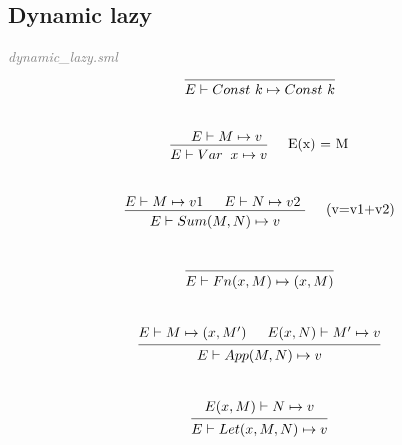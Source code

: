 \documentclass[a4paper]{article}
\begin{document}
	\subsection{Dynamic lazy}
	\textit{\textcolor{gray}{dynamic\_lazy.sml}} \\
	\[
		\begin{prooftree}
			\hypo{}
			\infer1[]{E \vdash Const \ k\mapsto Const \ k}
		\end{prooftree}
	\]
	\\
	\[
		\begin{prooftree}
			\hypo{E \vdash M \mapsto v }
			\infer1[\quad E(x) = M]{E \vdash Var &x \mapsto v}
		\end{prooftree}
	\]
	\\
	\[
		\begin{prooftree}
			\hypo{E \vdash M \mapsto v1}
			\hypo{E \vdash N \mapsto v2 }
			\infer2[\quad (v=v1+v2)]{E \vdash Sum(M, N) \mapsto v}
		\end{prooftree}
	\]
	\\
	\[
		\begin{prooftree}
			\hypo{}
			\infer1[]{E \vdash Fn(x, M) \mapsto (x, M)}
		\end{prooftree}
	\]
	\\
	\[
		\begin{prooftree}
			\hypo{E \vdash M \mapsto (x, M')}
			\hypo{E(x, N) \vdash M' \mapsto v}
			\infer2[]{E \vdash App(M, N) \mapsto v}
		\end{prooftree}
	\]
	\\
	\[
		\begin{prooftree}
			\hypo{E(x,M) \vdash N \mapsto v}
			\infer1[]{E \vdash Let(x, M, N) \mapsto v }
		\end{prooftree}
	\]
	
\end{document}
